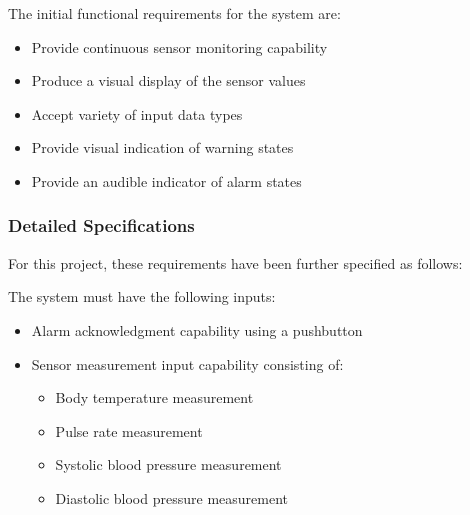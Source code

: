 \documentclass[12pt]{article} %
\begin{document}
\begin{itemize}[$$]
  \item The initial functional requirements for the system are:
    \begin{itemize}[$\bullet$]
      \item Provide continuous sensor monitoring capability
      \item Produce a visual display of the sensor values
      \item Accept variety of input data types
      \item Provide visual indication of warning states
      \item Provide an audible indicator of alarm states
    \end{itemize}
\end{itemize}

\subsubsection{Detailed Specifications}
For this project, these requirements have been further specified as follows:

\begin{itemize}[$$]
  \item The system must have the following inputs:
    \begin{itemize}[$\bullet$]
      \item Alarm acknowledgment capability using a pushbutton
      \item Sensor measurement input capability consisting of:
	\begin{itemize}
	\item Body temperature measurement
	\item Pulse rate measurement
	\item Systolic blood pressure measurement
	\item Diastolic blood pressure measurement
	\end{itemize}
    \end{itemize}
\end{itemize}
\end{document}
